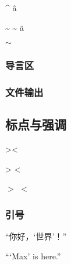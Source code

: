             \^{} \^a

            \textasciitilde
            \~{} \~a

            $\sim$

        \subsubsection{导言区}

        \subsubsection{文件输出}

    \subsection{标点与强调}
            \textgreater \textless 

            > < 
            
            $>$ $<$ 

            \subsubsection{引号}
            “你好，‘世界’！” 
            
            ``\thinspace`Max' is here.'' 
    
